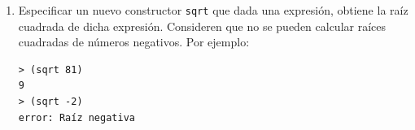 \documentclass{article}
\begin{document}
\begin{enumerate}
\begin{enumerate}
        \item Especificar un nuevo constructor \texttt{sqrt} que dada una expresión, obtiene la raíz cuadrada de dicha expresión. Consideren que no se pueden calcular raíces cuadradas de números negativos. Por ejemplo:
          \begin{verbatim}
> (sqrt 81)
9
> (sqrt -2)
error: Raíz negativa
          \end{verbatim}
      \end{enumerate}

  \end{enumerate}
\end{document}
